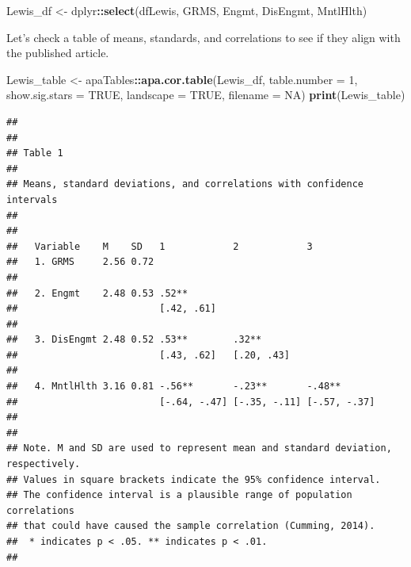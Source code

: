 \documentclass[
  11pt,
]{book}
\newenvironment{Shaded}{\begin{snugshade}}{\end{snugshade}}
\newcommand{\AttributeTok}[1]{\textcolor[rgb]{0.27,0.27,0.27}{#1}}
\newcommand{\ConstantTok}[1]{\textcolor[rgb]{0.37,0.37,0.37}{#1}}
\newcommand{\DecValTok}[1]{\textcolor[rgb]{0.06,0.06,0.06}{#1}}
\newcommand{\FunctionTok}[1]{\textcolor[rgb]{0.27,0.27,0.27}{\textbf{#1}}}
\newcommand{\NormalTok}[1]{#1}
\newcommand{\OtherTok}[1]{\textcolor[rgb]{0.37,0.37,0.37}{#1}}
\newcommand{\SpecialCharTok}[1]{\textcolor[rgb]{0.43,0.43,0.43}{\textbf{#1}}}
\begin{document}
\begin{Shaded}
\begin{Highlighting}[]
\NormalTok{Lewis\_df }\OtherTok{\textless{}{-}}\NormalTok{ dplyr}\SpecialCharTok{::}\FunctionTok{select}\NormalTok{(dfLewis, GRMS, Engmt, DisEngmt, MntlHlth)}
\end{Highlighting}
\end{Shaded}

Let's check a table of means, standards, and correlations to see if they align with the published article.

\begin{Shaded}
\begin{Highlighting}[]
\NormalTok{Lewis\_table }\OtherTok{\textless{}{-}}\NormalTok{ apaTables}\SpecialCharTok{::}\FunctionTok{apa.cor.table}\NormalTok{(Lewis\_df, }\AttributeTok{table.number =} \DecValTok{1}\NormalTok{, }\AttributeTok{show.sig.stars =} \ConstantTok{TRUE}\NormalTok{,}
    \AttributeTok{landscape =} \ConstantTok{TRUE}\NormalTok{, }\AttributeTok{filename =} \ConstantTok{NA}\NormalTok{)}
\FunctionTok{print}\NormalTok{(Lewis\_table)}
\end{Highlighting}
\end{Shaded}

\begin{verbatim}
## 
## 
## Table 1 
## 
## Means, standard deviations, and correlations with confidence intervals
##  
## 
##   Variable    M    SD   1            2            3           
##   1. GRMS     2.56 0.72                                       
##                                                               
##   2. Engmt    2.48 0.53 .52**                                 
##                         [.42, .61]                            
##                                                               
##   3. DisEngmt 2.48 0.52 .53**        .32**                    
##                         [.43, .62]   [.20, .43]               
##                                                               
##   4. MntlHlth 3.16 0.81 -.56**       -.23**       -.48**      
##                         [-.64, -.47] [-.35, -.11] [-.57, -.37]
##                                                               
## 
## Note. M and SD are used to represent mean and standard deviation, respectively.
## Values in square brackets indicate the 95% confidence interval.
## The confidence interval is a plausible range of population correlations 
## that could have caused the sample correlation (Cumming, 2014).
##  * indicates p < .05. ** indicates p < .01.
## 
\end{verbatim}
\end{document}
